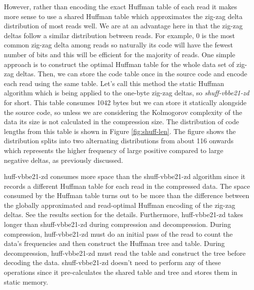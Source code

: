 However, rather than encoding the exact Huffman table of each read it makes more
sense to use a shared Huffman table which approximates the zig-zag delta
distribution of most reads well. We are at an advantage here in that the zig-zag
deltas follow a similar distribution between reads.
For example, 0 is the most common zig-zag delta among reads so naturally its code will
have the fewest number of bits and this will be efficient for the majority of
reads. One simple approach is to construct the optimal Huffman table for the
whole data set of zig-zag deltas. Then, we can store the code table once in the
source code and encode each read using the same table. Let's call this method
the static Huffman algorithm which is being applied to the one-byte zig-zag
deltas, so \textit{shuff-vbbe21-zd} for short. This table consumes
1042 bytes but we can store it statically alongside the source code, so unless
we are considering the Kolmogorov complexity of the data its size is not
calculated in the compression size. The distribution of code lengths from this
table is shown in Figure \ref{fig:shuff-len}. The figure shows the distribution
splits into two alternating distributions from about 116 onwards which
represents the higher frequency of large positive compared to large negative
deltas, as previously discussed.

huff-vbbe21-zd consumes more space than the shuff-vbbe21-zd algorithm since it
records a different Huffman table for each read in the compressed data. The
space consumed by the Huffman table turns out to be more than the difference
between the globally approximated and read-optimal Huffman encoding of the
zig-zag deltas.  See the results section for the details.
Furthermore, huff-vbbe21-zd takes longer than shuff-vbbe21-zd during compression and decompression.
During compression, huff-vbbe21-zd must do an initial pass of the read to count the data's
frequencies and then construct the Huffman tree and table. During
decompression, huff-vbbe21-zd must read the table and construct the tree before decoding
the data. shuff-vbbe21-zd doesn't need to perform any of these operations since it
pre-calculates the shared table and tree and stores them in static memory.

